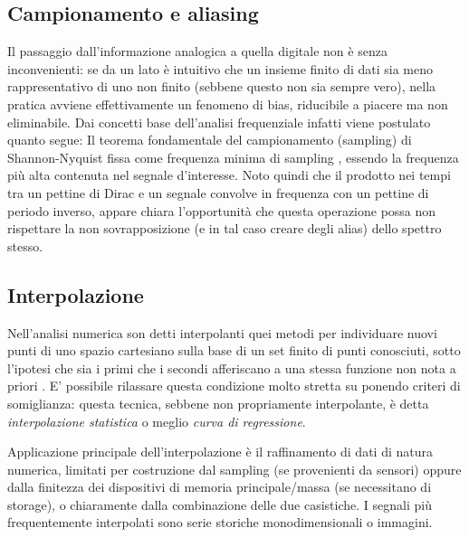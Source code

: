 	\subsection{Campionamento e aliasing}
Il passaggio dall'informazione analogica a quella digitale non è senza inconvenienti: se da un lato è intuitivo che un insieme finito di dati sia meno rappresentativo di uno non finito (sebbene questo non sia sempre vero), nella pratica avviene effettivamente un fenomeno di bias, riducibile a piacere ma non eliminabile. Dai concetti base dell'analisi frequenziale infatti viene postulato quanto segue: 
Il teorema fondamentale del campionamento (sampling) di Shannon-Nyquist fissa come frequenza minima di sampling , essendo  la frequenza più alta contenuta nel segnale d'interesse.
Noto quindi che il prodotto nei tempi tra un pettine di Dirac e un segnale  convolve in frequenza  con un pettine di periodo inverso, appare chiara l'opportunità che questa operazione possa non rispettare la non sovrapposizione (e in tal caso creare degli alias) dello spettro stesso.
	\subsection{Interpolazione}
Nell'analisi numerica son detti interpolanti quei metodi per individuare nuovi punti di uno spazio cartesiano sulla base di un set finito di punti conosciuti, sotto l'ipotesi che sia i primi che i secondi afferiscano a una stessa funzione  non nota a priori \cite{WIKI}. E' possibile rilassare questa condizione molto stretta su  ponendo criteri di somiglianza: questa tecnica, sebbene non propriamente interpolante, è detta {\em interpolazione statistica} o meglio {\em curva di regressione}.

Applicazione principale dell'interpolazione è il raffinamento di dati di natura numerica, limitati per costruzione dal sampling (se provenienti da sensori) oppure dalla finitezza dei dispositivi di memoria principale/massa (se necessitano di storage), o chiaramente dalla combinazione delle due casistiche. I segnali più frequentemente interpolati sono serie storiche monodimensionali o immagini.

